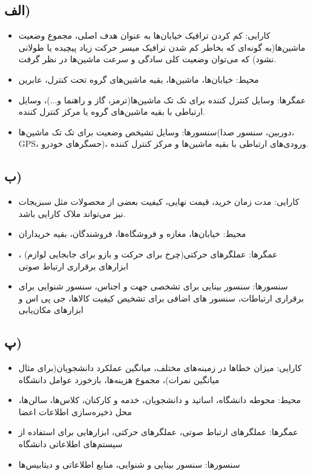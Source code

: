 \documentclass{article}
\begin{document}
\subsection*{الف)}
\begin{itemize}
	\item کارایی:
		کم کردن ترافیک خیابان‌ها به عنوان هدف اصلی، مجموع وضعیت ماشین‌ها(به گونه‌ای که بخاطر کم شدن ترافیک میسر حرکت زیاد پیچیده یا طولانی نشود)  که می‌توان وضعیت کلی سادگی و سرعت ماشین‌ها در نظر گرفت.
	\item محیط:
	خیابان‌ها، ماشین‌ها، بقیه‌ ماشین‌های گروه تحت کنترل، عابرین	

	\item عمگرها:
وسایل‌ کنترل کننده برای تک تک ماشین‌ها(ترمز، گاز و راهنما و...)، وسایل ارتباطی با بقیه ماشین‌های گروه یا مرکز کنترل کننده.	

	\item سنسورها: 
وسایل تشیخص وضعیت برای تک تک ماشین‌ها(دوربین، سنسور صدا، GPS، حسگر‌های خودرو)، ورودی‌های ارتباطی با بقیه ماشین‌ها و مرکز کنترل کننده.
\end{itemize}


\subsection*{ب)}
\begin{itemize}
	\item کارایی:
مدت زمان خرید، قیمت نهایی، کیفیت بعضی از محصولات مثل سبزیجات نیز می‌تواند ملاک کارایی باشد.

	\item محیط:
خیابان‌ها، مغازه‌ و فروشگاه‌ها، فروشندگان، بقیه خریداران

	\item عمگرها:
عملگر‌های حرکتی(چرخ برای حرکت و بازو برای جابجایی لوازم) ، ابزار‌های برقراری ارتباط صوتی

	\item سنسورها: 
سنسور بینایی برای تشخصی جهت و اجناس، سنسور شنوایی برای برقراری ارتباطات، سنسور های اضافی برای تشخیص کیفیت کالاها، جی پی اس و ابزار‌های مکان‌یابی
\end{itemize}


\subsection*{پ)}
\begin{itemize}
	\item کارایی:
میزان خطا‌ها در زمینه‌های مختلف، میانگین عملکرد دانشجویان(برای مثال میانگین نمرات)، مجموع هزینه‌ها، بازخورد عوامل دانشگاه

	\item محیط:
محوطه دانشگاه، اساتید و دانشجویان، خدمه و کارکنان، کلاس‌ها، سالن‌ها، محل ذخیره‌سازی اطلاعات اعضا

	\item عمگرها:
عملگر‌های ارتباط صوتی، عملگرهای حرکتی، ابزارهایی برای استفاده از سیستم‌های اطلاعاتی دانشگاه

	\item سنسورها: 
سنسور بینایی و شنوایی، منابع اطلاعاتی و دیتابیس‌ها
\end{itemize}
\end{document}
